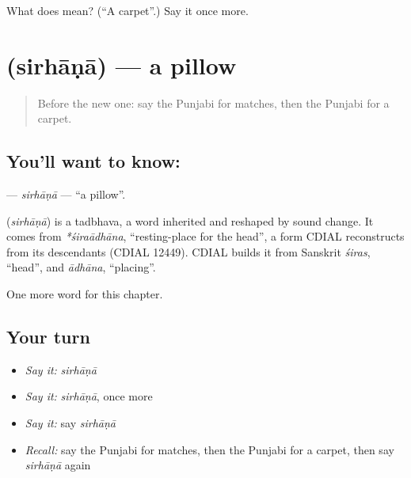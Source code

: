 \begin{tcolorbox}[breakable,colback=teal!4,colframe=teal!35!black,title={Before you move on}]
What does  mean? (\textquotedblleft{}A carpet\textquotedblright{}.) Say it once more.
\end{tcolorbox}
\section[\texorpdfstring{\pa{ਸਿਰਹਾਣਾ} (sirhāṇā)}{ਸਿਰਹਾਣਾ (sirhāṇā)}]{ (sirhāṇā) — a pillow}

\label{lesson:PA-C118-sirhana}



\begin{quote}
Before the new one: say the Punjabi for matches, then the Punjabi for a carpet.
\end{quote}

\subsection*{You'll want to know: }
\textbf{} — \emph{sirhāṇā} — \textquotedblleft{}a pillow\textquotedblright{}.

\begin{cousinweb}
\textbf{} (\emph{sirhāṇā}) is a tadbhava, a word inherited and reshaped by sound change. It comes from \emph{*śiraādhāna}, \textquotedblleft{}resting-place for the head\textquotedblright{}, a form CDIAL reconstructs from its descendants (CDIAL 12449). CDIAL builds it from Sanskrit \emph{śiras}, \textquotedblleft{}head\textquotedblright{}, and \emph{ādhāna}, \textquotedblleft{}placing\textquotedblright{}.
\end{cousinweb}

\begin{grammarlens}[title={What you've built}]
One more word for this chapter.
\end{grammarlens}

\subsection*{Your turn}
\begin{itemize}
\raggedright
  \item \emph{Say it:} \emph{sirhāṇā}
  \item \emph{Say it:} \emph{sirhāṇā}, once more
  \item \emph{Say it:} say \emph{sirhāṇā}
  \item \emph{Recall:} say the Punjabi for matches, then the Punjabi for a carpet, then say \emph{sirhāṇā} again
\end{itemize}

